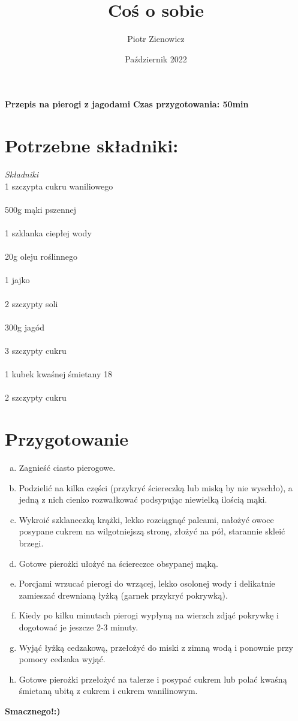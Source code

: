 \documentclass[12pt, letterpaper, titlepage]{article}
\title{Coś o sobie}
\author{Piotr Zienowicz}
\date{Październik 2022}
\begin{document}
\maketitle
\textbf{Przepis na pierogi z jagodami}
\textbf{Czas przygotowania: 50min}
\section{Potrzebne składniki:}
\textit{Składniki}
\\ 1 szczypta cukru waniliowego\\
\\ 500g mąki pszennej\\
\\ 1 szklanka ciepłej wody\\
\\ 20g oleju roślinnego\\
\\ 1 jajko\\
\\ 2 szczypty soli\\
\\ 300g jagód\\
\\ 3 szczypty cukru\\
\\ 1 kubek kwaśnej śmietany 18\\
\\ 2 szczypty cukru\\
\section{Przygotowanie}
\begin{enumerate}[a)]
\item{Zagnieść ciasto pierogowe.}
\item{Podzielić na kilka części (przykryć ściereczką lub miską by nie wyschło), a jedną z nich cienko rozwałkować podsypując niewielką ilością mąki.}
\item{Wykroić szklaneczką krążki, lekko rozciągnąć palcami, nałożyć owoce posypane cukrem na wilgotniejszą stronę, złożyć na pół, starannie skleić brzegi.}
\item{Gotowe pierożki ułożyć na ściereczce obsypanej mąką.}
\item{Porcjami wrzucać pierogi do wrzącej, lekko osolonej wody i delikatnie zamieszać drewnianą łyżką (garnek przykryć pokrywką).}
\item{Kiedy po kilku minutach pierogi wypłyną na wierzch zdjąć pokrywkę i dogotować je jeszcze 2-3 minuty.}
\item{Wyjąć łyżką cedzakową, przełożyć do miski z zimną wodą i ponownie przy pomocy cedzaka wyjąć.}
\item{Gotowe pierożki przełożyć na talerze i posypać cukrem lub polać kwaśną śmietaną ubitą z cukrem i cukrem wanilinowym.}
\end{enumerate}
\textbf{Smacznego!:)}
\end{document}

